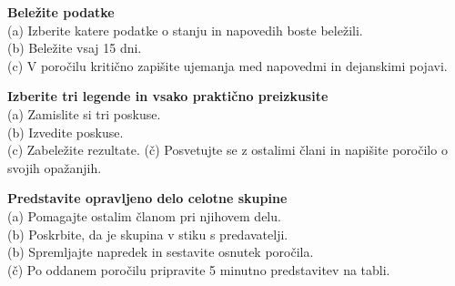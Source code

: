 \begin{prob}
	\label{Nal:GnssPrak_Belez}
	\textbf{Beležite podatke }\\
	(a) Izberite katere podatke o stanju in napovedih boste beležili.\\
	(b) Beležite vsaj 15 dni. \\
	(c) V poročilu kritično zapišite ujemanja med napovedmi in dejanskimi pojavi.
\end{prob}

\begin{prob}
	\label{Nal:GnssPrak_Eksp}
	\textbf{Izberite tri legende in vsako praktično preizkusite}\\
	(a) Zamislite si tri poskuse.\\
	(b) Izvedite poskuse. \\
	(c) Zabeležite rezultate.
	(č) Posvetujte se z ostalimi člani in napišite poročilo o svojih opažanjih.
\end{prob}

\begin{prob}
	\label{Nal:GnssPrak_Predst}
	\textbf{Predstavite opravljeno delo celotne skupine}\\
	(a) Pomagajte ostalim članom pri njihovem delu. \\
	(b) Poskrbite, da je skupina v stiku s predavatelji.\\
	(b) Spremljajte napredek in sestavite osnutek poročila. \\
	(č) Po oddanem poročilu pripravite 5 minutno predstavitev na tabli.
\end{prob}
%
